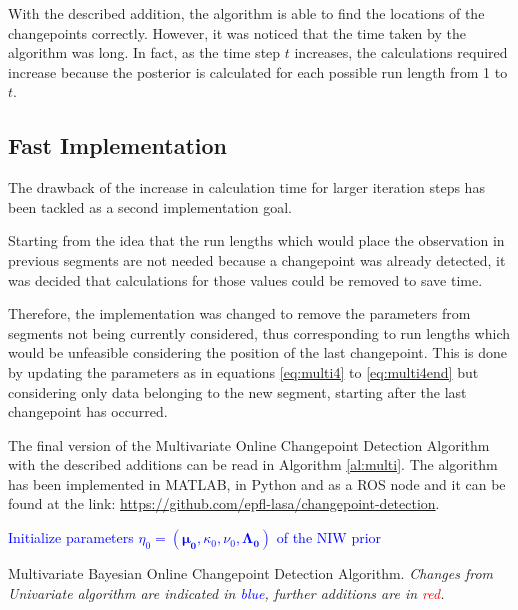 \documentclass[11pt,twoside,a4paper]{report}
\begin{document}
With the described addition, the algorithm is able to find the locations of the changepoints correctly. However, it was noticed that the time taken by the algorithm was long. In fact, as the time step $t$ increases, the calculations required increase because the posterior is calculated for each possible run length from 1 to $t$.


\subsection{Fast Implementation}

The drawback of the increase in calculation time for larger iteration steps has been tackled as a second implementation goal.

Starting from the idea that the run lengths which would place the observation in previous segments are not needed because a changepoint was already detected, it was decided that calculations for those values could be removed to save time.

Therefore, the implementation was changed to remove the parameters from segments not being currently considered, thus corresponding to run lengths which would be unfeasible considering the position of the last changepoint. This is done by updating the parameters as in equations \ref{eq:multi4} to \ref{eq:multi4end} but considering only data belonging to the new segment, starting after the last changepoint has occurred.

The final version of the Multivariate Online Changepoint Detection Algorithm with the described additions can be read in Algorithm \ref{al:multi}. The algorithm has been implemented in MATLAB, in Python and as a ROS node and it can be found at the link: \url{https://github.com/epfl-lasa/changepoint-detection}.

\begin{algorithm}[h]
\textcolor{blue}{Initialize parameters \(\eta_0 = (\boldsymbol{\mu_0}, \kappa_0, \nu_0, \boldsymbol{\Lambda_0})\) of the NIW prior\; } 

\caption{Multivariate Bayesian Online Changepoint Detection Algorithm. \textit{Changes from Univariate algorithm are indicated in \textcolor{blue}{blue}, further additions are in \textcolor{red}{red}.}
}
\label{al:multi}
\end{algorithm}
\end{document}
